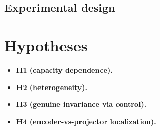 \documentclass[11pt]{article}
\begin{document}
\subsection{Experimental design}

\section{Hypotheses}
\label{sec:hyp}
\begin{itemize}
  \item \textbf{H1 (capacity dependence).}
  \item \textbf{H2 (heterogeneity).}
  \item \textbf{H3 (genuine invariance via control).}
  \item \textbf{H4 (encoder-vs-projector localization).}
\end{itemize}

\end{document}
